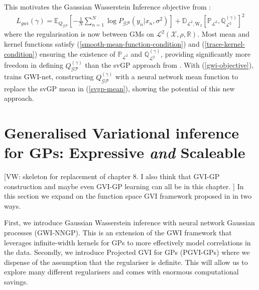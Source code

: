 \documentclass{article}
\newcommand{\vw}[1]{{\color{green} [VW: #1]}}
\newcommand{\GP}{\operatorname{\mathcal{GP}}}
\numberwithin{equation}{section}
\begin{document}
This motivates the Gaussian Wasserstein Inference objective from \cite{wild2022generalized}:
\begin{align}
    \label{gwi-objective}
    L_{gwi}(\gamma) = \mathbb{E}_{Q_{\GP}}\left[- \frac{1}{N}\sum_{n=1}^N \log P_{\GP}\left(y_n \vert x_n, \sigma^2\right) \right] + \mathbb{D}_{\mathcal{L}^2, \text{W}_2} \left[\mathbb{P}_{\mathcal{L}^2}, \mathbb{Q}^{(\gamma)}_{\mathcal{L}^2}\right]^2
\end{align}
where the regularisation is now between GMs on $\mathcal{L}^2(\mathcal{X}, \rho, \mathbb{R})$. Most mean and kernel functions satisfy (\ref{smooth-mean-function-condition}) and (\ref{trace-kernel-condition}) ensuring the existence of $\mathbb{P}_{\mathcal{L}^2}$ and $\mathbb{Q}^{(\gamma)}_{\mathcal{L}^2}$, providing significantly more freedom in defining $Q^{(\gamma)}_{\GP}$ than the svGP approach from \cite{titsias2009variational}. With (\ref{gwi-objective}), \cite{wild2022generalized} trains GWI-net, constructing $Q^{(\gamma)}_{\GP}$ with a neural network mean function to replace the svGP mean in (\ref{svgp-mean}), showing the potential of this new approach.


\newpage

\section{Generalised Variational inference for GPs: Expressive \textit{and} Scaleable}

\vw{skeleton for replacement of chapter 8. I also think that GVI-GP construction and maybe even GVI-GP learning can all be in this chapter. }
In this section we expand on the function space GVI framework proposed in \citet{wild2022generalized} in two ways. 

First, we introduce Gaussian Wasserstein inference with neural network Gaussian processes (GWI-NNGP). This is an extension of the GWI framework that leverages infinite-width kernels for GPs to more effectively model correlations in the data. Secondly, we introduce Projected GVI for GPs (PGVI-GPs) where we dispense of the assumption that the regulariser is definite. This will allow us to explore many different regularisers and comes with enormous computational savings. 
\end{document}
